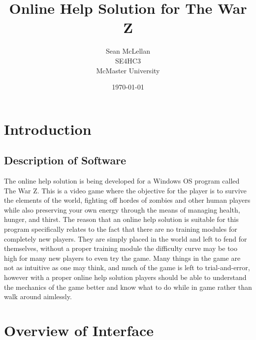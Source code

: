 \documentclass[12pt]{report}
\title{Online Help Solution for The War Z}
\author{Sean McLellan\\ SE4HC3\\ McMaster University}
\date{\today}
\begin{document}
\maketitle

\chapter{Introduction}

\section{Description of Software}
The online help solution is being developed for a Windows OS program called The War Z. This is a video game where the objective for the player is to survive the elements of the world, fighting off hordes of zombies and other human players while also preserving your own energy through the means of managing health, hunger, and thirst. The reason that an online help solution is suitable for this program specifically relates to the fact that there are no training modules for completely new players. They are simply placed in the world and left to fend for themselves, without a proper training module the difficulty curve may be too high for many new players to even try the game. Many things in the game are not as intuitive as one may think, and much of the game is left to trial-and-error, however with a proper online help solution players should be able to understand the mechanics of the game better and know what to do while in game rather than walk around aimlessly.

\chapter{Overview of Interface}
\end{document}
